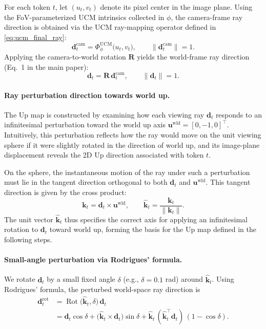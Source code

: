 For each token \(t\), let \((u_t, v_t)\) denote its pixel center in the image
plane. Using the FoV-parameterized UCM intrinsics collected in \(\phi\), the
camera-frame ray direction is obtained via the UCM ray-mapping operator
defined in \cref{eq:ucm_final_ray}:
\begin{equation}
\bm{d}^{\mathrm{cam}}_t
=
\Phi^{\mathrm{UCM}}_{\phi}\!\big(u_t, v_t\big),
\qquad
\|\bm{d}^{\mathrm{cam}}_t\| = 1.
\end{equation}
Applying the camera-to-world rotation \(\mathbf{R}\) yields the world-frame ray
direction (Eq.~1 in the main paper):
\begin{equation}
\bm{d}_t = \mathbf{R}\,\bm{d}^{\mathrm{cam}}_t,
\qquad
\|\bm{d}_t\| = 1.
\end{equation}

\paragraph{Ray perturbation direction towards world up.}
The Up map is constructed by examining how each viewing ray \(\bm{d}_t\)
responds to an infinitesimal perturbation toward the world up axis
\(\bm{u}^{\mathrm{wld}}=[0,-1,0]^\top\).
Intuitively, this perturbation reflects how the ray would move on the unit
viewing sphere if it were slightly rotated in the direction of world up, and
its image-plane displacement reveals the 2D Up direction associated with token
\(t\).

On the sphere, the instantaneous motion of the ray under such a perturbation
must lie in the tangent direction orthogonal to both \(\bm{d}_t\) and
\(\bm{u}^{\mathrm{wld}}\).  
This tangent direction is given by the cross product:
\begin{equation}
\bm{k}_t = \bm{d}_t \times \bm{u}^{\mathrm{wld}},
\qquad
\hat{\bm{k}}_t = \frac{\bm{k}_t}{\|\bm{k}_t\|}.
\label{eq:up_axis_suppl}
\end{equation}
The unit vector \(\hat{\bm{k}}_t\) thus specifies the correct axis for applying
an infinitesimal rotation to \(\bm{d}_t\) toward world up, forming the basis for
the Up map defined in the following steps.

\paragraph{Small-angle perturbation via Rodrigues' formula.}
We rotate \(\bm{d}_t\) by a small fixed angle \(\delta\) (e.g., \(\delta=0.1\) rad)
around \(\hat{\bm{k}}_t\).  
Using Rodrigues' formula, the perturbed world-space ray direction is
\begin{align}
\bm{d}^{\mathrm{rot}}_t
&=
\operatorname{Rot}\!\big(\hat{\bm{k}}_t,\delta\big)\,\bm{d}_t
\\[3pt]
&=
\bm{d}_t \cos\delta
+
\big(\hat{\bm{k}}_t \times \bm{d}_t\big)\sin\delta
+
\hat{\bm{k}}_t\,(\hat{\bm{k}}_t^\top \bm{d}_t)\,(1-\cos\delta).
\label{eq:up_rodrigues}
\end{align}

